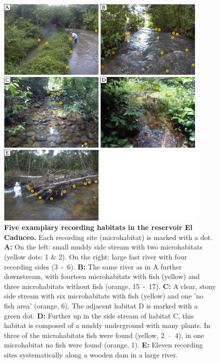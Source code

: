 \begin{figure}[H]
    \centering
    \includegraphics[width = 0.9\textwidth]{pictures/Methods/all_habitats.png}
    \caption{\textbf{Five examplary recording habitats in the reservoir El Caduceo.} Each recording site (microhabitat) is marked with a dot. \textbf{A:} On the left: small muddy side stream with two microhabitats (yellow dots: 1 \& 2). On the right: large fast river with four recording sides (3~-~6). \textbf{B:} The same river as in A further downstream, with fourteen microhabitats with fish (yellow) and three microhabitats without fish (orange, 15~-~17). \textbf{C:} A clear, stony side stream with six microhabitats with fish (yellow) and one 'no fish area' (orange, 6). The adjacent habitat D is marked with a green dot. \textbf{D:} Further up in the side stream of habitat C, this habitat is composed of a muddy underground with many plants. In three of the microhabitats fish were found (yellow, 2~–~4), in one microhabitat no fish were found (orange, 1). \textbf{E:} Eleven recording sites systematically along a wooden dam in a large river.}
    \label{fig:habitats}
\end{figure}

